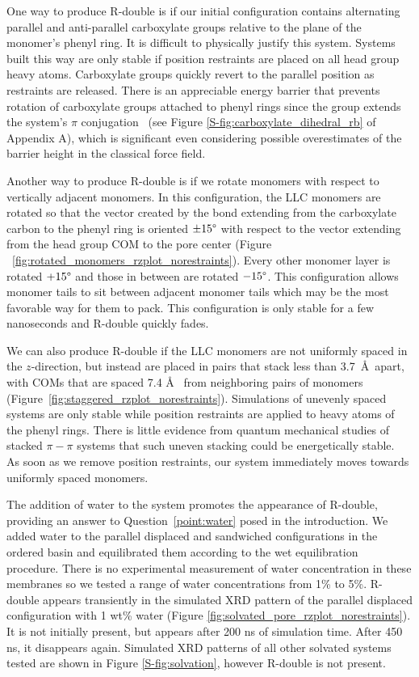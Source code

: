   One way to produce R-double is if our initial configuration contains
  alternating parallel and anti-parallel carboxylate groups relative to the plane
  of the monomer's phenyl ring. It is difficult to physically justify this
  system. Systems built this way are only stable if position restraints are
  placed on all head group heavy atoms. Carboxylate groups quickly revert to the
  parallel position as restraints are released. There is an appreciable energy
  barrier that prevents rotation of carboxylate groups attached to phenyl rings
  since the group extends the system's $\pi$ conjugation~\cite{carey_organic_2011} (see Figure
  \ref{S-fig:carboxylate_dihedral_rb} of Appendix A), which is significant even considering
  possible overestimates of the barrier height in the classical force field. 

  Another way to produce R-double is if we rotate monomers with respect to
  vertically adjacent monomers. In this configuration, the LLC monomers are rotated so
  that the vector created by the bond extending from the carboxylate carbon to
  the phenyl ring is oriented $\pm 15 \degree$ with respect to the vector
  extending from the head group COM to the pore center (Figure
  ~\ref{fig:rotated_monomers_rzplot_norestraints}). Every other monomer layer is
  rotated $+15 \degree$ and those in between are rotated $-15 \degree$. This
  configuration allows monomer tails to sit between adjacent monomer tails which
  may be the most favorable way for them to pack. This configuration is only
  stable for a few nanoseconds and R-double quickly fades.  
  
  \label{modification:rdouble}
  We can also produce R-double if the LLC monomers are not uniformly spaced in
  the $z$-direction, but instead are placed in pairs that stack less than
  3.7~\AA~apart, with COMs that are spaced 7.4 \AA~ from neighboring pairs of
  monomers (Figure~\ref{fig:staggered_rzplot_norestraints}). Simulations of
  unevenly spaced systems are only stable while position restraints are applied
  to heavy atoms of the phenyl rings. There is little evidence from quantum
  mechanical studies of stacked $\pi-\pi$ systems that such uneven stacking could
  be energetically stable.~\cite{tauer_beyond_2005} As soon as we remove position
  restraints, our system immediately moves towards uniformly spaced monomers. 
 
  The addition of water to the system promotes the appearance of R-double,
  providing an answer to Question~\ref{point:water} posed in the introduction.
  We added water to the parallel displaced and sandwiched configurations in the
  ordered basin and equilibrated them according to the wet equilibration
  procedure. There is no experimental measurement of water concentration in these
  membranes so we tested a range of water concentrations from 1\% to 5\%.
  R-double appears transiently in the simulated XRD pattern of the parallel
  displaced configuration with 1 wt\% water (Figure
  \ref{fig:solvated_pore_rzplot_norestraints}). It is not initially present, but
  appears after 200 ns of simulation time. After 450 ns, it disappears again.
  Simulated XRD patterns of all other solvated systems tested are shown in Figure
  \ref{S-fig:solvation}, however R-double is not present.

